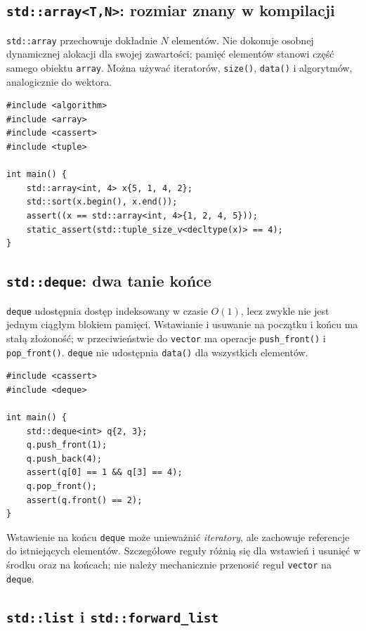 \subsection{\texttt{std::array<T,N>}: rozmiar znany w kompilacji}

\texttt{std::array} przechowuje dokładnie $N$ elementów. Nie dokonuje
osobnej dynamicznej alokacji dla swojej zawartości; pamięć elementów
stanowi część samego obiektu \texttt{array}. Można używać iteratorów,
\texttt{size()}, \texttt{data()} i algorytmów, analogicznie do wektora.

\begin{lstlisting}[caption={std::array i algorytmy standardowe (C++17); kompletny program.}]
#include <algorithm>
#include <array>
#include <cassert>
#include <tuple>

int main() {
    std::array<int, 4> x{5, 1, 4, 2};
    std::sort(x.begin(), x.end());
    assert((x == std::array<int, 4>{1, 2, 4, 5}));
    static_assert(std::tuple_size_v<decltype(x)> == 4);
}
\end{lstlisting}

\subsection{\texttt{std::deque}: dwa tanie końce}

\texttt{deque} udostępnia dostęp indeksowany w czasie $O(1)$, lecz
zwykle nie jest jednym ciągłym blokiem pamięci. Wstawianie i usuwanie
na początku i końcu ma stałą złożoność; w przeciwieństwie do
\texttt{vector} ma operacje \texttt{push\_front()} i \texttt{pop\_front()}.
\texttt{deque} nie udostępnia \texttt{data()} dla wszystkich elementów.

\begin{lstlisting}[caption={Kolejka dwustronna (C++11); kompletny program.}]
#include <cassert>
#include <deque>

int main() {
    std::deque<int> q{2, 3};
    q.push_front(1);
    q.push_back(4);
    assert(q[0] == 1 && q[3] == 4);
    q.pop_front();
    assert(q.front() == 2);
}
\end{lstlisting}

Wstawienie na końcu \texttt{deque} może unieważnić \emph{iteratory},
ale zachowuje referencje do istniejących elementów. Szczegółowe reguły
różnią się dla wstawień i usunięć w środku oraz na końcach; nie należy
mechanicznie przenosić reguł \texttt{vector} na \texttt{deque}.

\subsection{\texttt{std::list} i \texttt{std::forward\_list}}

